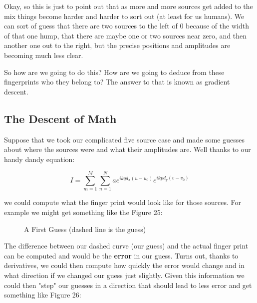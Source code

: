\documentclass[10pt,a4paper]{article}
\begin{document}
Okay, so this is just to point out that as more and more sources get added to the mix things become harder and harder to sort out (at least for us humans). We can sort of guess that there are two sources to the left of 0 because of the width of that one hump, that there are maybe one or two sources near zero, and then another one out to the right, but the precise positions and amplitudes are becoming much less clear. 

So how are we going to do this? How are we going to deduce from these fingerprints who they belong to? The answer to that is known as gradient descent. 

\subsection{The Descent of Math}
Suppose that we took our complicated five source case and made some guesses about where the sources were and what their amplitudes are. Well thanks to our handy dandy equation:

\begin{equation}
I=\sum_{m=1}^M \sum_{n=1}^N  ae^{ikqd_x(u-u_0)}e^{ikpd_y(v-v_0)}
\end{equation}

we could compute what the finger print would look like for those sources. For example we might get something like the Figure 25:

\begin{figure}[!htb]
\caption{\label{fig:my-label} A First Guess (dashed line is the guess)}
\end{figure}

The difference between our dashed curve (our guess) and the actual finger print can be computed and would be the \textbf{error} in our guess. Turns out, thanks to derivatives, we could then compute how quickly the error would change and in what direction if we changed our guess just slightly. Given this information we could then "step" our guesses in a direction that should lead to less error and get something like Figure 26: 
\end{document}

